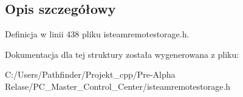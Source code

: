 \subsection{Opis szczegółowy}


Definicja w linii 438 pliku isteamremotestorage.\+h.



Dokumentacja dla tej struktury została wygenerowana z pliku\+:\begin{DoxyCompactItemize}
\item 
C\+:/\+Users/\+Pathfinder/\+Projekt\+\_\+cpp/\+Pre-\/\+Alpha Relase/\+P\+C\+\_\+\+Master\+\_\+\+Control\+\_\+\+Center/isteamremotestorage.\+h\end{DoxyCompactItemize}
